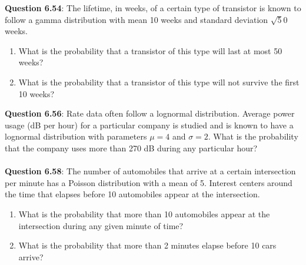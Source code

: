 \documentclass{article}
\begin{document}
    \noindent\textbf{Question 6.54}: The lifetime, in weeks, of a certain type of 
    transistor is known to follow a gamma distribution with mean 10 weeks and standard 
    deviation $\sqrt50$ weeks.
        \begin{enumerate}[label = (\alph*) ]
            \item What is the probability that a transistor of this type will last at 
            most 50 weeks?
            \item  What is the probability that a transistor of this type will not 
            survive the first 10 weeks?
        \end{enumerate}
    
    \noindent\textbf{Question 6.56}: Rate data often follow a lognormal distribution.
    Average power usage (dB per hour) for a particular company is studied and is known 
    to have a lognormal distribution with parameters $\mu = 4$ and $\sigma = 2$. What
    is the probability that the company uses more than 270 dB during any particular hour?\\\\
    
    \noindent\textbf{Question 6.58}: The number of automobiles that arrive at a certain 
    intersection per minute has a Poisson distribution with a mean of 5. Interest centers 
    around the time that elapses before 10 automobiles appear at the intersection.
        \begin{enumerate}[label = (\alph*) ]
            \item What is the probability that more than 10 automobiles appear at the 
            intersection during any given minute of time?
            \item What is the probability that more than 2 minutes elapse before 10 
            cars arrive?
        \end{enumerate}
\end{document}
